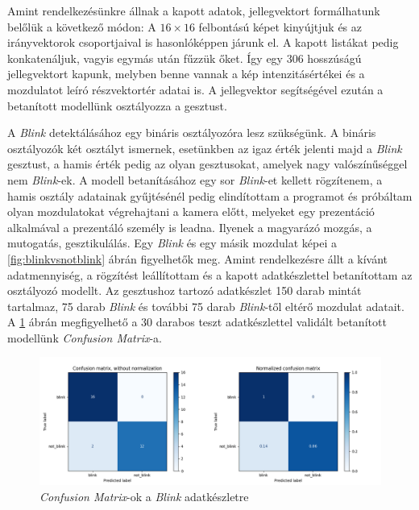 Amint rendelkezésünkre állnak a kapott adatok, jellegvektort formálhatunk belőlük a következő módon: A $16\times16$ felbontású képet kinyújtjuk és az irányvektorok csoportjaival is hasonlóképpen járunk el. A kapott listákat pedig konkatenáljuk, vagyis egymás után fűzzük őket. Így egy 306 hosszúságú jellegvektort kapunk, melyben benne vannak a kép intenzitásértékei és a mozdulatot leíró részvektortér adatai is. A jellegvektor segítségével ezután a betanított modellünk osztályozza a gesztust.

A \textit{Blink} detektálásához egy bináris osztályozóra lesz szükségünk. A bináris osztályozók két osztályt ismernek, esetünkben az igaz érték jelenti majd a \textit{Blink} gesztust, a hamis érték pedig az olyan gesztusokat, amelyek nagy valószínűséggel nem \textit{Blink}-ek. A modell betanításához egy sor \textit{Blink}-et kellett rögzítenem, a hamis osztály adatainak gyűjtésénél pedig elindítottam a programot és próbáltam olyan mozdulatokat végrehajtani a kamera előtt, melyeket egy prezentáció alkalmával a prezentáló személy is leadna. Ilyenek a magyarázó mozgás, a mutogatás, gesztikulálás. Egy \textit{Blink} és egy másik mozdulat képei a \ref{fig:blinkvsnotblink} ábrán figyelhetők meg. Amint rendelkezésre állt a kívánt adatmennyiség, a rögzítést leállítottam és a kapott adatkészlettel betanítottam az osztályozó modellt. Az gesztushoz tartozó adatkészlet 150 darab mintát tartalmaz, 75 darab \textit{Blink} és további 75 darab \textit{Blink}-től eltérő mozdulat adatait. A \ref{fig:blinkconfusion} ábrán megfigyelhető a 30 darabos teszt adatkészlettel validált betanított modellünk \textit{Confusion Matrix}-a.
\begin{figure}[h]
\centering
\includegraphics[width=\textwidth]{images/blink_confusion.png}
\caption{\textit{Confusion Matrix}-ok a \textit{Blink} adatkészletre}
\label{fig:blinkconfusion}
\end{figure}

